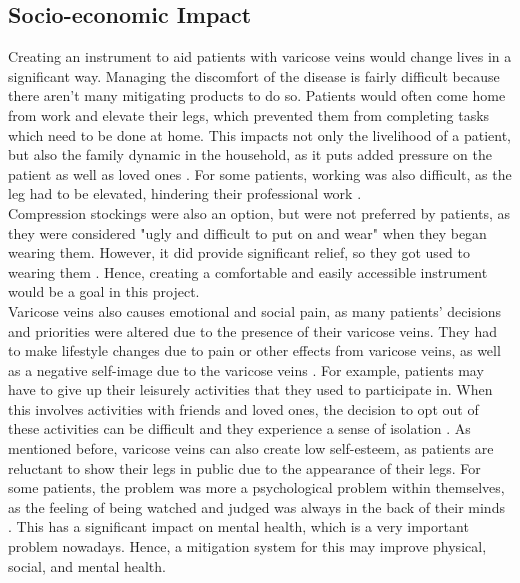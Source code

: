 \documentclass[11.5pt]{article}
\begin{document}
\subsection{Socio-economic Impact}
Creating an instrument to aid patients with varicose veins would change lives in a significant way. Managing the discomfort of the disease is fairly difficult because there aren't many mitigating products to do so. Patients would often come home from work and elevate their legs, which prevented them from completing tasks which need to be done at home. This impacts not only the livelihood of a patient, but also the family dynamic in the household, as it puts added pressure on the patient as well as loved ones \cite{JCN}. For some patients, working was also difficult, as the leg had to be elevated, hindering their professional work \cite{JCN}.\\

Compression stockings were also an option, but were not preferred by patients, as they were considered "ugly and difficult to put on and wear" when they began wearing them. However, it did provide significant relief, so they got used to wearing them \cite{JCN}. Hence, creating a comfortable and easily accessible instrument would be a goal in this project. \\

Varicose veins also causes emotional and social pain, as many patients' decisions and priorities were altered due to the presence of their varicose veins. They had to make lifestyle changes due to pain or other effects from varicose veins, as well as a negative self-image due to the varicose veins \cite{JCN}. For example, patients may have to give up their leisurely activities that they used to participate in. When this involves activities with friends and loved ones, the decision to opt out of these activities can be difficult and they experience a sense of isolation \cite{JCN}. As mentioned before, varicose veins can also create low self-esteem, as patients are reluctant to show their legs in public due to the appearance of their legs. For some patients, the problem was more a psychological problem within themselves, as the feeling of being watched and judged was always in the back of their minds \cite{JCN}. This has a significant impact on mental health, which is a very important problem nowadays. Hence, a mitigation system for this may improve physical, social, and mental health.\\
\end{document}
